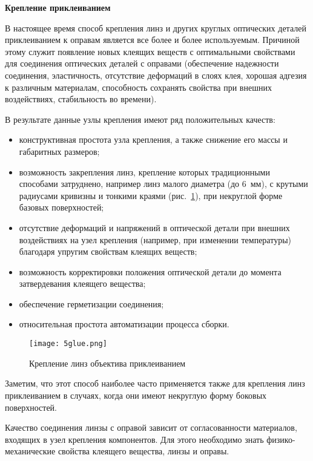 \begin{flushleft}
	\textbf{Крепление приклеиванием}
\end{flushleft}

В настоящее время способ крепления линз и других круглых оптических деталей приклеиванием к оправам является все более и более используемым. Причиной этому служит появление новых клеящих веществ с оптимальными свойствами для соединения оптических деталей с оправами (обеспечение надежности соединения, эластичность, отсутствие деформаций в слоях клея, хорошая адгезия к различным материалам, способность сохранять свойства при внешних воздействиях, стабильность во времени).

В результате данные узлы крепления имеют ряд положительных качеств:
\begin{itemize}
\item конструктивная простота узла крепления, а также снижение его массы и габаритных размеров;
\item возможность закрепления линз, крепление которых традиционными способами затруднено, например линз малого диаметра (до 6~мм), с крутыми радиусами кривизны и тонкими краями (рис.~\ref{pic:5glue}), при некруглой форме базовых поверхностей;
\item отсутствие деформаций и напряжений в оптической детали при внешних воздействиях на узел крепления (например, при изменении температуры) благодаря упругим свойствам клеящих веществ;
\item возможность корректировки положения оптической детали до момента затвердевания клеящего вещества;
\item обеспечение герметизации соединения;
\item относительная простота автоматизации процесса сборки.
\end{itemize}

\begin{figure}[h!]
	\caption{Крепление линз объектива приклеиванием}
	\texttt{[image: 5glue.png]}
	\label{pic:5glue}
\end{figure}

Заметим, что этот способ наиболее часто применяется также для крепления линз приклеиванием в случаях, когда они имеют некруглую форму боковых поверхностей.

Качество соединения линзы с оправой зависит от согласованности материалов, входящих в узел крепления компонентов. Для этого необходимо знать физико-механические свойства клеящего вещества, линзы и оправы.

